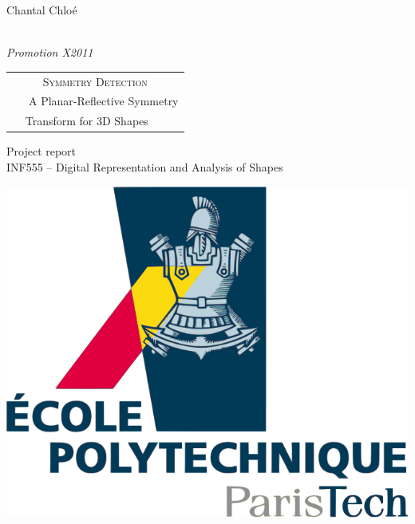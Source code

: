 \thispagestyle{empty}							%
%
	\begin{center}
		\hfill
		Chantal 
		\hfill \hfill
		Chloé \bsc{Macur}
		\hfill ~
		\par
		\noindent
		\\
		\vspace{0.7cm}
		\textit{Promotion X2011}
		\vfill\vfill
		\Huge
		\begin{tabular}{c}
			\hline
			{\Large{\textsc{Symmetry Detection}}}\\
			~~~A Planar-Reflective Symmetry\\ Transform for 3D Shapes~~~\\
			\hline
		\end{tabular}
		\large
		\vfill
		 Project report\\
		 INF555 -- Digital Representation and Analysis of Shapes
	\end{center}
	\vfill
	\begin{flushright}
	\includegraphics[scale=0.1]{img/logo_x.png}
	\end{flushright}
	\newpage 